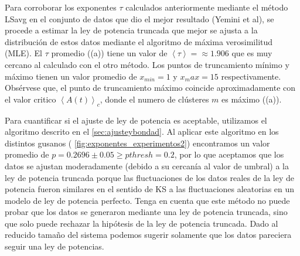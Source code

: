  
 Para corroborar los exponentes $\tau$ calculados anteriormente mediante el método LSavg en el conjunto de datos que dio el mejor resultado (Yemini et al), se procede a estimar la ley de potencia truncada que mejor se ajusta a la distribución   de estos datos  mediante  el algoritmo  de máxima verosimilitud (MLE).  El $\tau$ promedio ((a)) tiene un valor de $\left\langle \tau \right\rangle =\approx 1.906 $  que es muy cercano al calculado con el otro método.   Los puntos  de truncamiento mínimo  y máximo   tienen un valor  promedio de $x_{min}=1$ y $x_max=15$ respectivamente.  Obsérvese que, el punto de truncamiento máximo coincide aproximadamente con el valor critico $\left\langle A(t) \right\rangle_c$, donde el numero de clústeres $m$ es máximo ((a)).    
 
Para cuantificar si el ajuste de ley de potencia es aceptable, utilizamos el  algoritmo  descrito en el \cref{sec:ajusteybondad}.  Al aplicar este algoritmo en los distintos gusanos ( \cref{fig:exponentes_experimentos2}) encontramos un valor promedio de $p=0.2696\pm 0.05 \geq pthresh =0.2$, por lo que aceptamos que los datos se ajustan moderadamente (debido a su cercanía al valor de umbral) a la ley de potencia truncada porque las fluctuaciones de los datos reales de la ley de potencia fueron similares en el sentido de KS a las fluctuaciones aleatorias en un modelo de ley de potencia perfecto.  Tenga en cuenta que este método no puede probar que los datos se generaron mediante una ley de potencia truncada, sino que solo puede rechazar la hipótesis de la ley de potencia truncada. Dado al reducido tamaño del sistema podemos sugerir solamente que los datos pareciera seguir una ley de potencias. 
 

